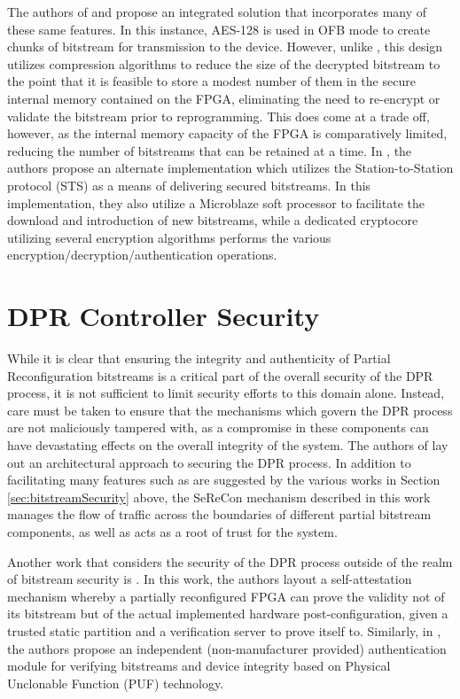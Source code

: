 The authors of \cite{vliegen_single-chip_2013} and \cite{vliegen_partial_2014} propose an integrated solution that incorporates many of these same features. In this instance, AES-128 is used in OFB mode to create chunks of bitstream for transmission to the device. However, unlike \cite{hori_bitstream_2013}, this design utilizes compression algorithms to reduce the size of the decrypted bitstream to the point that it is feasible to store a modest number of them in the secure internal memory contained on the FPGA, eliminating the need to re-encrypt or validate the bitstream prior to reprogramming. This does come at a trade off, however, as the internal memory capacity of the FPGA is comparatively limited, reducing the number of bitstreams that can be retained at a time. In \cite{vliegen_secure_2014}, the authors propose an alternate implementation which utilizes the Station-to-Station protocol (STS) as a means of delivering secured bitstreams. In this implementation, they also utilize a Microblaze soft processor to facilitate the download and introduction of new bitstreams, while a dedicated cryptocore utilizing several encryption algorithms performs the various 
encryption/decryption/authentication operations.

\section{DPR Controller Security} \label{sec:DPRControllerSecurity} While it is clear that ensuring the integrity and authenticity of Partial Reconfiguration bitstreams is a critical part of the overall security of the DPR process, it is not sufficient to limit security efforts to this domain alone. Instead, care must be taken to ensure that the mechanisms which govern the DPR process are not maliciously tampered with, as a compromise in these components can have devastating effects on the overall integrity of the system. The authors of \cite{kepa_serecon_2010} lay out an architectural approach to securing the DPR process. In addition to facilitating many features such as are suggested by the various works in Section \ref{sec:bitstreamSecurity} above, the SeReCon mechanism described in this work manages the flow of traffic across the boundaries of different partial bitstream components, as well as acts as a root of trust for the system.

Another work that considers the security of the DPR process outside of the realm of bitstream security is \cite{vliegen_sacha_2019}. In this work, the authors layout a self-attestation mechanism whereby a partially reconfigured FPGA can prove the validity not of its bitstream but of the actual implemented hardware post-configuration, given a trusted static partition and a verification server to prove itself to. Similarly, in \cite{jacob_securing_2017}, the authors propose an independent (non-manufacturer provided) authentication module for verifying bitstreams and device integrity based on Physical Unclonable Function (PUF) technology.

